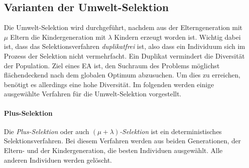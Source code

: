 

\subsection{Varianten der Umwelt-Selektion}
Die Umwelt-Selektion wird durchgeführt, nachdem aus der Elterngeneration mit $\mu$ Eltern die Kindergeneration mit $\lambda$ Kindern erzeugt worden ist. Wichtig dabei ist, dass das Selektionsverfahren \textit{duplikatfrei} ist, also dass ein Individuum sich im Prozess der Selektion nicht vermehrfacht. Ein Duplikat vermindert die Diversität der Population. Ziel eines \acs{EA} ist, den Suchraum des Problems möglichst flächendeckend nach dem globalen Optimum abzusuchen. Um dies zu erreichen, benötigt es allerdings eine hohe Diversität. Im folgenden werden einige ausgewählte Verfahren für die Umwelt-Selektion vorgestellt. 

\paragraph{Plus-Selektion}
Die \textit{Plus-Selektion} oder auch $(\mu + \lambda)$\textit{-Selektion} ist ein deterministisches Selektionsverfahren. Bei diesem Verfahren werden aus beiden Generationen, der Eltern- und der Kindergeneration, die besten Individuen ausgewählt. Alle anderen Individuen werden gelöscht. 

